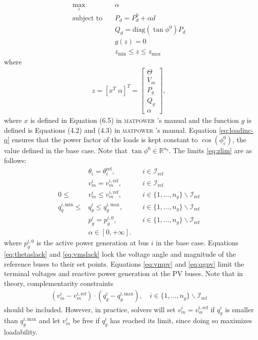 \documentclass[12pt,a4]{article}
\newcommand*{\field}[1]{\mathbb{#1}}
\newcommand*{\R}{\field{R}} %
\newcommand*{\matpower}{\textsc{matpower} }
\begin{document}
\begin{subequations}\label{eq:maxll}
\begin{align}
  \max_{z} \quad & \alpha \label{eq:maxll-obj} \\
  \text{subject to} \quad & P_d = P_d^0 + \alpha d \label{eq:loadinc}\\
   & Q_d = \text{diag}(\tan \phi^0) P_d \label{eq:loadinc-q}\\
   & g(z) = 0 \\
   & z_\text{min} \leq z \leq z_\text{max} \label{eq:zlim}
\end{align}  
\end{subequations}
where
\begin{align}
  \label{eq:z}
  z = [x^T \; \alpha]^T =  \begin{bmatrix}
    \Theta \\
    V_m \\
    P_g \\
    Q_g \\
    \alpha
  \end{bmatrix},
\end{align}
where $x$ is defined in Equation (6.5) in \matpower's manual and the function $g$ is defined is Equations (4.2) and (4.3) in \matpower's manual.
Equation \eqref{eq:loadinc-q} ensures that the power factor of the loads is kept constant to $\cos(\phi_i^0)$, the value defined in the base case.
Note that $\tan \phi^0 \in \R^{n_b}$.
The limits \eqref{eq:zlim} are as follows:
\begin{align}
  & \theta_i = \theta_i^\text{ref}, && i \in \mathcal{I}_\text{ref} \label{eq:thetaslack} \\
  & v_m^{i} = v_m^{i,\text{ref}}, && i \in \mathcal{I}_\text{ref} \label{eq:vmslack} \\
  0 \leq & v_m^{i} \leq v_m^{i,\text{ref}}, && i \in \{1,\ldots,n_g\} \backslash \mathcal{I}_\text{ref} \label{eq:vmpv} \\
  q_q^{i,\text{min}} \leq & q_g^i \leq q_g^{i,\text{max}}, && i \in \{1,\ldots,n_g\} \backslash \mathcal{I}_\text{ref} \label{eq:qgpv}\\
  & p_g^i = p_g^{i,0}, && i \in \{1,\ldots,n_g\} \backslash \mathcal{I}_\text{ref} \\
  & \alpha \in [0,+\infty].
\end{align}
where $p_g^{i,0}$ is the active power generation at bus $i$ in the base case.
Equations \eqref{eq:thetaslack} and \eqref{eq:vmslack} lock the voltage angle and magnitude of the reference buses to their set points.
Equations \eqref{eq:vmpv} and \eqref{eq:qgpv} limit the terminal voltages and reactive power generation at the PV buses. 
Note that in theory, complementarity constraints
\begin{align}
  \label{eq:comp-constr}
  (v_m^i-v_m^{i,\text{ref}})\cdot(q_g^i-q_g^{i,\text{max}}), \quad i \in \{1,\ldots,n_g\} \backslash \mathcal{I}_\text{ref}
\end{align}
should be included. 
However, in practice, solvers will set $v_m^i = v_m^{i,\text{ref}}$ if $q_g^i$ is smaller than $q_g^{i,\text{max}}$ and let $v_m^i$ be free if $q_g^i$ has reached its limit, since doing so maximizes loadability.
\end{document}
